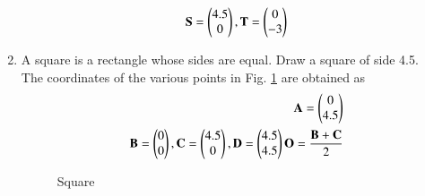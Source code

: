 \begin{enumerate}[label=\thesubsection.\arabic*.,ref=\thesubsection.\theenumi]
\begin{align}
\mathbf{S} = \begin{pmatrix}4.5\\0\end{pmatrix},
\mathbf{T} = \begin{pmatrix}0\\-3\end{pmatrix}
\end{align}
%
\item A square is a rectangle whose sides are equal.  Draw a square of side 4.5.
\\
\solution The coordinates of the various points in Fig. \ref{fig:square} are obtained as
%
\begin{align}
\vec{A} = \myvec{0\\4.5}
\\
\vec{B} = \myvec{0\\0},
\vec{C} = \myvec{4.5\\0},
\vec{D} = \myvec{4.5\\4.5}
\vec{O} = \frac{\vec{B}+\vec{C}}{2}
%
\end{align}
%
\begin{figure}[!ht]
	\begin{center}
		\resizebox{\columnwidth}{!}{}
	\end{center}
	\caption{Square}
	\label{fig:square}	
\end{figure}

%
\end{enumerate}
